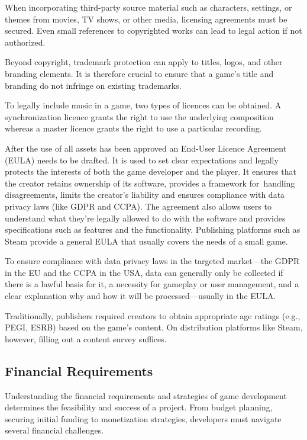 When incorporating third-party source material such as characters, settings, or themes from movies, TV shows, or other media, licensing agreements must be secured. Even small references to copyrighted works can lead to legal action if not authorized.
\cite{silva_guide-to-release, jd-supra_ip}

Beyond copyright, trademark protection can apply to titles, logos, and other branding elements. It is therefore crucial to ensure that a game’s title and branding do not infringe on existing trademarks.
\cite{dragon_copyright}

To legally include music in a game, two types of licences can be obtained. A synchronization licence grants the right to use the underlying composition whereas a master licence grants the right to use a particular recording.
\cite{iconcollective_music-license}

After the use of all assets has been approved an End-User Licence Agreement (EULA) needs to be drafted\cite{silva_guide-to-release}. It is used to set clear expectations and legally protects the interests of both the game developer and the player. It ensures that the creator retains ownership of its software, provides a framework for~handling disagreements, limits the creator’s liability and ensures compliance with data privacy laws (like GDPR and CCPA). The agreement also allows users to understand what they're legally allowed to do with the software and provides specifications such as features and the functionality. Publishing platforms such as Steam provide a general EULA that usually covers the needs of a small game.
\cite{docupilot_eula, steam_content-survey}

To ensure compliance with data privacy laws in the targeted market---the GDPR in the EU and the CCPA in the USA, data can generally only be collected if there is a lawful basis for it, a necessity for gameplay or user management, and a clear explanation why and how it will be processed---usually in the EULA.
\cite{eu_gdpr, doj_ccpa, dentons_eu-data-protection, gamota_data-privacy}

Traditionally, publishers required creators to obtain appropriate age ratings (e.g., PEGI, ESRB) based on the game’s content. On distribution platforms like Steam, however, filling out a content survey suffices.
\cite{steam_content-survey}

\subsection{Financial Requirements}
Understanding the financial requirements and strategies of game development determines the feasibility and success of a project. From budget planning, securing initial funding to monetization strategies, developers must navigate several financial challenges.

